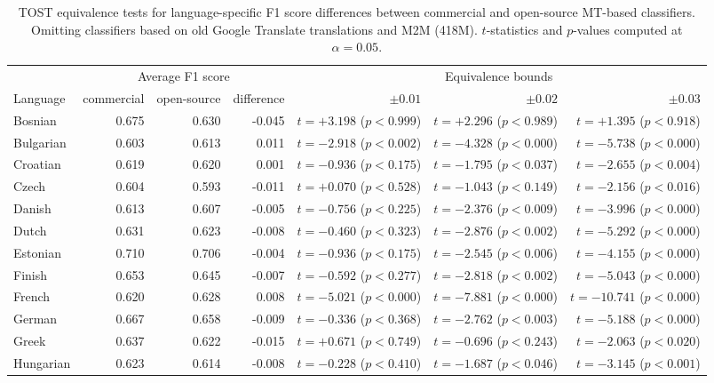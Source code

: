 \begingroup\fontsize{10}{12}\selectfont

\begin{longtable}[t]{lrrrrrr}
\caption{\label{tab:classifiers_f1_equivalence_by_lang}TOST equivalence tests for language-specific F1 score differences between commercial and open-source MT-based classifiers. Omitting classifiers based on old Google Translate translations and M2M (418M). $t$-statistics and $p$-values computed at $\alpha = 0.05$.}\\
\toprule
\multicolumn{1}{c}{ } & \multicolumn{3}{c}{Average F1 score} & \multicolumn{3}{c}{Equivalence bounds} \\
\cmidrule(l{3pt}r{3pt}){2-4} \cmidrule(l{3pt}r{3pt}){5-7}
Language & commercial & open-source & difference & $\pm 0.01$ & $\pm 0.02$ & $\pm 0.03$\\
\midrule
Bosnian & 0.675 & 0.630 & -0.045 & $t=+3.198$ ($p < 0.999$) & $t=+2.296$ ($p < 0.989$) & $t=+1.395$ ($p < 0.918$)\\
Bulgarian & 0.603 & 0.613 & 0.011 & $t=-2.918$ ($p < 0.002$) & $t=-4.328$ ($p < 0.000$) & $t=-5.738$ ($p < 0.000$)\\
Croatian & 0.619 & 0.620 & 0.001 & $t=-0.936$ ($p < 0.175$) & $t=-1.795$ ($p < 0.037$) & $t=-2.655$ ($p < 0.004$)\\
Czech & 0.604 & 0.593 & -0.011 & $t=+0.070$ ($p < 0.528$) & $t=-1.043$ ($p < 0.149$) & $t=-2.156$ ($p < 0.016$)\\
Danish & 0.613 & 0.607 & -0.005 & $t=-0.756$ ($p < 0.225$) & $t=-2.376$ ($p < 0.009$) & $t=-3.996$ ($p < 0.000$)\\
Dutch & 0.631 & 0.623 & -0.008 & $t=-0.460$ ($p < 0.323$) & $t=-2.876$ ($p < 0.002$) & $t=-5.292$ ($p < 0.000$)\\
Estonian & 0.710 & 0.706 & -0.004 & $t=-0.936$ ($p < 0.175$) & $t=-2.545$ ($p < 0.006$) & $t=-4.155$ ($p < 0.000$)\\
Finish & 0.653 & 0.645 & -0.007 & $t=-0.592$ ($p < 0.277$) & $t=-2.818$ ($p < 0.002$) & $t=-5.043$ ($p < 0.000$)\\
French & 0.620 & 0.628 & 0.008 & $t=-5.021$ ($p < 0.000$) & $t=-7.881$ ($p < 0.000$) & $t=-10.741$ ($p < 0.000$)\\
German & 0.667 & 0.658 & -0.009 & $t=-0.336$ ($p < 0.368$) & $t=-2.762$ ($p < 0.003$) & $t=-5.188$ ($p < 0.000$)\\
Greek & 0.637 & 0.622 & -0.015 & $t=+0.671$ ($p < 0.749$) & $t=-0.696$ ($p < 0.243$) & $t=-2.063$ ($p < 0.020$)\\
Hungarian & 0.623 & 0.614 & -0.008 & $t=-0.228$ ($p < 0.410$) & $t=-1.687$ ($p < 0.046$) & $t=-3.145$ ($p < 0.001$)\\

\end{longtable}
